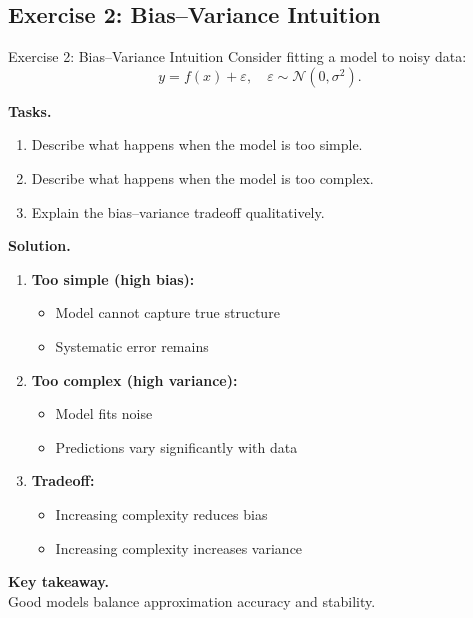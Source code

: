 \documentclass[aspectratio=169,11pt]{beamer}
\begin{document}
\subsection{Exercise 2: Bias--Variance Intuition}
\begin{frame}[t,allowframebreaks]{Exercise 2: Bias--Variance Intuition}
\small
Consider fitting a model to noisy data:
\[
y = f(x) + \varepsilon, \quad \varepsilon \sim \mathcal{N}(0, \sigma^2).
\]

\textbf{Tasks.}\\ \begin{enumerate}
    \item Describe what happens when the model is too simple.
    \item Describe what happens when the model is too complex.
    \item Explain the bias--variance tradeoff qualitatively.
\end{enumerate}

\textbf{Solution.}\\ \begin{enumerate}
    \item \textbf{Too simple (high bias):}\\ \begin{itemize}
        \item Model cannot capture true structure
        \item Systematic error remains
    \end{itemize}

    \item \textbf{Too complex (high variance):}\\ \begin{itemize}
        \item Model fits noise
        \item Predictions vary significantly with data
    \end{itemize}

    \item \textbf{Tradeoff:}\\ \begin{itemize}
        \item Increasing complexity reduces bias
        \item Increasing complexity increases variance
    \end{itemize}
\end{enumerate}

\textbf{Key takeaway.}\\ Good models balance approximation accuracy and stability.
\end{frame}
\end{document}

